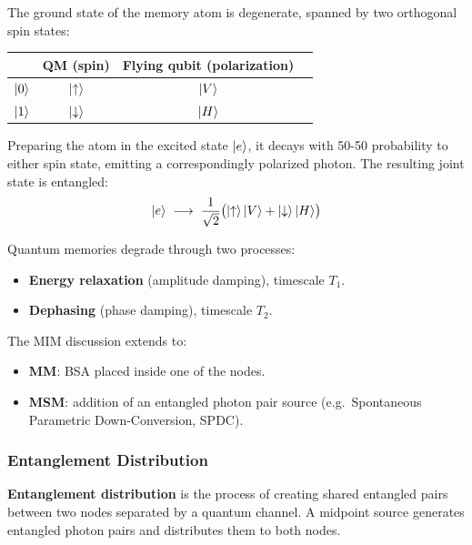 \documentclass[10pt,a4paper]{article}
\begin{document}
The ground state of the memory atom is degenerate, spanned by two orthogonal spin states:

\begin{center}
\begin{tabular}{lccc}
\hline
                       & \textbf{QM (spin)} & \textbf{Flying qubit (polarization)} \\
\hline
$\ket{0}$              & $\ket{\uparrow}$   & $\ket{V}$ \\
$\ket{1}$              & $\ket{\downarrow}$  & $\ket{H}$ \\
\hline
\end{tabular}
\end{center}

Preparing the atom in the excited state $\ket{e}$, it decays with 50-50 probability to either spin state, emitting a correspondingly polarized photon. The resulting joint state is entangled:
\begin{equation}
  \ket{e} \;\longrightarrow\; \frac{1}{\sqrt{2}}\bigl(\ket{\uparrow}\ket{V} + \ket{\downarrow}\ket{H}\bigr)
\end{equation}


Quantum memories degrade through two processes:
\begin{itemize}[nosep, leftmargin=*]
  \item \textbf{Energy relaxation} (amplitude damping), timescale $T_1$.
  \item \textbf{Dephasing} (phase damping), timescale $T_2$.
\end{itemize}

\medskip
The MIM discussion extends to:
\begin{itemize}[nosep, leftmargin=*]
  \item \textbf{MM}: BSA placed inside one of the nodes.
  \item \textbf{MSM}: addition of an entangled photon pair source (e.g.\ Spontaneous Parametric Down-Conversion, SPDC).
\end{itemize}

\subsubsection*{Entanglement Distribution}

\begin{tcolorbox}[defstyle, title={Definition}]
\textbf{Entanglement distribution} is the process of creating shared entangled pairs between two nodes separated by a quantum channel. A midpoint source generates entangled photon pairs and distributes them to both nodes.
\end{tcolorbox}
\end{document}
